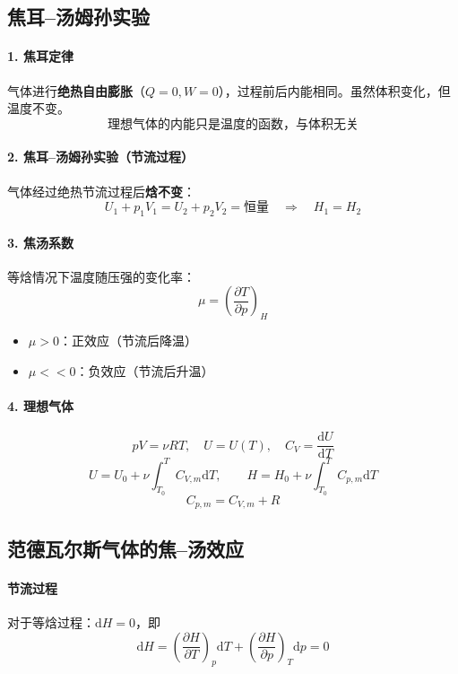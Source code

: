 \documentclass[UTF8]{ctexart}
\begin{document}
\subsection{焦耳--汤姆孙实验}

\paragraph{1. 焦耳定律}
气体进行\textbf{绝热自由膨胀}（$Q=0,W=0$），过程前后内能相同。虽然体积变化，但温度不变。
\[
\boxed{\text{理想气体的内能只是温度的函数，与体积无关}}
\]

\paragraph{2. 焦耳--汤姆孙实验（节流过程）}
气体经过绝热节流过程后\textbf{焓不变}：
\[
U_1+p_1V_1=U_2+p_2V_2=\text{恒量}
\quad\Longrightarrow\quad
H_1=H_2
\]

\paragraph{3. 焦汤系数}
等焓情况下温度随压强的变化率：
\[
\boxed{\mu=\left(\frac{\partial T}{\partial p}\right)_H}
\]
\begin{itemize}[leftmargin=2em]
  \item $\mu>0$：正效应（节流后降温）
  \item $\mu<<0$：负效应（节流后升温）
\end{itemize}

\paragraph{4. 理想气体}
\[
pV=\nu RT,\quad U=U(T),\quad C_V=\frac{\mathrm{d}U}{\mathrm{d}T}
\]
\[
U=U_0+\nu\int_{T_0}^T C_{V,m}\mathrm{d}T,\qquad
H=H_0+\nu\int_{T_0}^T C_{p,m}\mathrm{d}T
\]
\[
C_{p,m}=C_{V,m}+R
\]

\subsection{范德瓦尔斯气体的焦--汤效应}

\paragraph{节流过程}
对于等焓过程：$\mathrm{d}H=0$，即
\[
\mathrm{d}H=\left(\frac{\partial H}{\partial T}\right)_p\mathrm{d}T
+\left(\frac{\partial H}{\partial p}\right)_T\mathrm{d}p=0
\]
\end{document}
